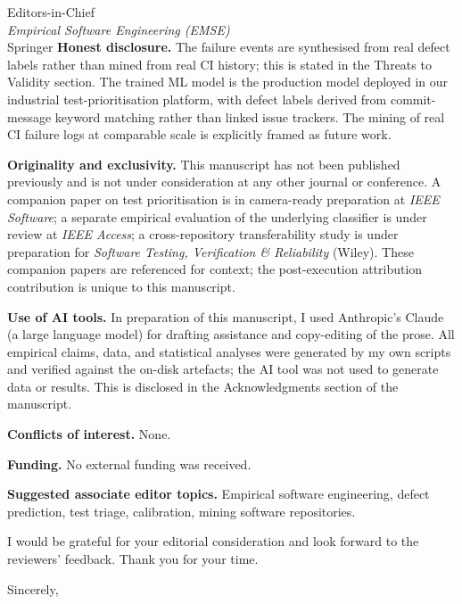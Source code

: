 \documentclass[11pt,letterpaper]{letter}
\begin{document}
\begin{letter}{Editors-in-Chief \\ \textit{Empirical Software Engineering (EMSE)} \\ Springer}
\textbf{Honest disclosure.} The failure events are synthesised from real defect labels rather than mined from real CI history; this is stated in the Threats to Validity section. The trained ML model is the production model deployed in our industrial test-prioritisation platform, with defect labels derived from commit-message keyword matching rather than linked issue trackers. The mining of real CI failure logs at comparable scale is explicitly framed as future work.

\textbf{Originality and exclusivity.} This manuscript has not been published previously and is not under consideration at any other journal or conference. A companion paper on test prioritisation is in camera-ready preparation at \textit{IEEE Software}; a separate empirical evaluation of the underlying classifier is under review at \textit{IEEE Access}; a cross-repository transferability study is under preparation for \textit{Software Testing, Verification \& Reliability} (Wiley). These companion papers are referenced for context; the post-execution attribution contribution is unique to this manuscript.

\textbf{Use of AI tools.} In preparation of this manuscript, I used Anthropic's Claude (a large language model) for drafting assistance and copy-editing of the prose. All empirical claims, data, and statistical analyses were generated by my own scripts and verified against the on-disk artefacts; the AI tool was not used to generate data or results. This is disclosed in the Acknowledgments section of the manuscript.

\textbf{Conflicts of interest.} None.

\textbf{Funding.} No external funding was received.

\textbf{Suggested associate editor topics.} Empirical software engineering, defect prediction, test triage, calibration, mining software repositories.

I would be grateful for your editorial consideration and look forward to the reviewers' feedback. Thank you for your time.

\closing{Sincerely,}

\end{letter}
\end{document}
